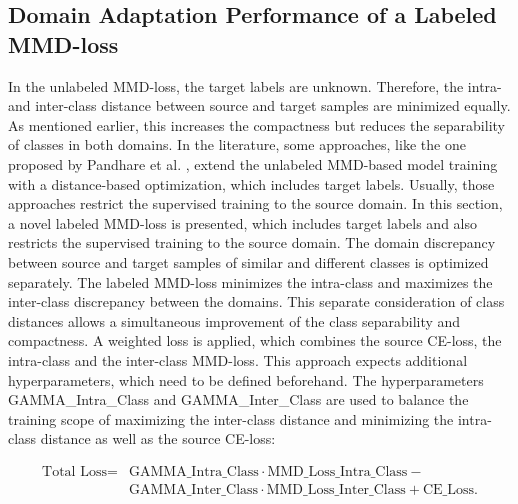 \subsection{Domain Adaptation Performance of a Labeled MMD-loss} \label{sec:Differences of labeled and unlabeled MMD loss}

In the unlabeled MMD-loss, the target labels are unknown. Therefore, the intra- and inter-class distance between source and target samples are minimized equally. As mentioned earlier, this increases the compactness but reduces the separability of classes in both domains. In the literature, some approaches, like the one proposed by Pandhare et al. \cite{Pandhare2021}, extend the unlabeled MMD-based model training with a distance-based optimization, which includes target labels. Usually, those approaches restrict the supervised training to the source domain. In this section, a novel labeled MMD-loss is presented, which includes target labels and also restricts the supervised training to the source domain. The domain discrepancy between source and target samples of similar and different classes is optimized separately. The labeled MMD-loss minimizes the intra-class and maximizes the inter-class discrepancy between the domains. This separate consideration of class distances allows a simultaneous improvement of the class separability and compactness. A weighted loss is applied, which combines the source CE-loss, the intra-class and the inter-class MMD-loss. This approach expects additional hyperparameters, which need to be defined beforehand. The hyperparameters GAMMA\_Intra\_Class and GAMMA\_Inter\_Class are used to balance the training scope of maximizing the inter-class distance and minimizing the intra-class distance as well as the source CE-loss:

\begin{equation}
\begin{split}
    \mbox{Total Loss} = & \mbox{GAMMA\_Intra\_Class}  \cdot \mbox{MMD\_Loss\_Intra\_Class} - \\
                              &\mbox{GAMMA\_Inter\_Class} \cdot \mbox{MMD\_Loss\_Inter\_Class} + \mbox{CE\_Loss}.
\end{split}
\end{equation}

